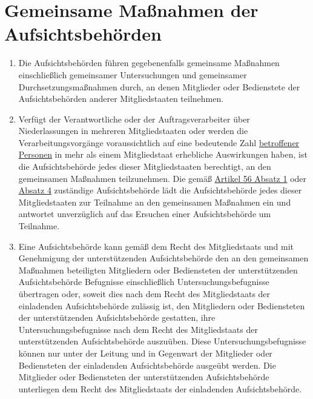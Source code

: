 \chapter{Gemeinsame Maßnahmen der Aufsichtsbehörden}
\label{ch:62}


\begin{enumerate}

  \item Die Aufsichtsbehörden führen gegebenenfalls gemeinsame Maßnahmen einschließlich gemeinsamer Untersuchungen und
   gemeinsamer Durchsetzungsmaßnahmen durch, an denen Mitglieder oder Bedienstete der Aufsichtsbehörden anderer
   Mitgliedstaaten teilnehmen.
  \label{itm:62-1}

  \item Verfügt der Verantwortliche oder der Auftragsverarbeiter über Niederlassungen in mehreren Mitgliedstaaten oder
   werden die Verarbeitungsvorgänge voraussichtlich auf eine bedeutende Zahl \hyperref[itm:04-1]{betroffener Personen} in mehr als einem
   Mitgliedstaat erhebliche Auswirkungen haben, ist die Aufsichtsbehörde jedes dieser Mitgliedstaaten berechtigt, an
   den gemeinsamen Maßnahmen teilzunehmen. Die gemäß \hyperref[itm:56-1]{Artikel 56 Absatz 1} oder \hyperref[itm:56-4]
   {Absatz 4} zuständige Aufsichtsbehörde lädt die Aufsichtsbehörde jedes dieser Mitgliedstaaten zur Teilnahme an den
   gemeinsamen Maßnahmen ein und antwortet unverzüglich auf das Ersuchen einer Aufsichtsbehörde um Teilnahme.
  \label{itm:62-2}

  \item Eine Aufsichtsbehörde kann gemäß dem Recht des Mitgliedstaats und mit Genehmigung der unterstützenden
   Aufsichtsbehörde den an den gemeinsamen Maßnahmen beteiligten Mitgliedern oder Bediensteten der unterstützenden
   Aufsichtsbehörde Befugnisse einschließlich Untersuchungsbefugnisse übertragen oder, soweit dies nach dem Recht des
   Mitgliedstaats der einladenden Aufsichtsbehörde zulässig ist, den Mitgliedern oder Bediensteten der unterstützenden
   Aufsichtsbehörde gestatten, ihre Untersuchungsbefugnisse nach dem Recht des Mitgliedstaats der unterstützenden
   Aufsichtsbehörde auszuüben. Diese Untersuchungsbefugnisse können nur unter der Leitung und in Gegenwart der
   Mitglieder oder Bediensteten der einladenden Aufsichtsbehörde ausgeübt werden. Die Mitglieder oder Bediensteten der
   unterstützenden Aufsichtsbehörde unterliegen dem Recht des Mitgliedstaats der einladenden Aufsichtsbehörde.
  \label{itm:62-3}


\end{enumerate}
